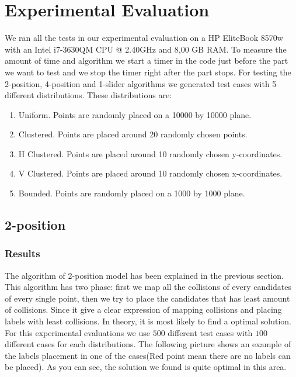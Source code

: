 \documentclass[crop=false,a4paper,oneside,11pt]{standalone}
\begin{document}
\section{Experimental Evaluation}

We ran all the tests in our experimental evaluation on a HP EliteBook 8570w with an Intel i7-3630QM CPU @ 2.40GHz and 8,00 GB RAM. To measure the amount of time and algorithm we start a timer in the code just before the part we want to test and we stop the timer right after the part stops. For testing the 2-position, 4-position and 1-slider algorithms we generated test cases with 5 different distributions. These distributions are:
\begin{enumerate}
    \item Uniform. Points are randomly placed on a 10000 by 10000 plane.
    \item Clustered. Points are placed around 20 randomly chosen points.
    \item H Clustered. Points are placed around 10 randomly chosen y-coordinates.
    \item V Clustered. Points are placed around 10 randomly chosen x-coordinates.
    \item Bounded. Points are randomly placed on a 1000 by 1000 plane.
\end{enumerate}

\subsection{2-position}
\subsubsection{Results}
The algorithm of 2-position model has been explained in the previous section. This algorithm has two phase: first we map all the collisions of every candidates of every single point, then we try to place the candidates that has least amount of collisions. Since it give a clear expression of mapping collisions and placing labels with least collisions. In theory, it is most likely to find a optimal solution. For this experimental evaluations we use $500$ different test cases with $100$ different cases for each distributions. The following picture shows an example of the labels placement in one of the cases(Red point mean there are no labels can be placed). As you can see, the solution we found is quite optimal in this area.
\end{document}
